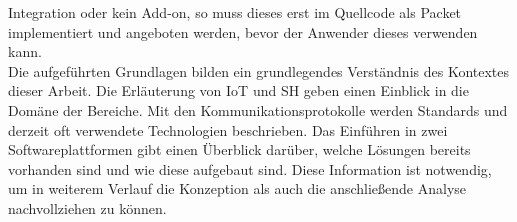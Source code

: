     Integration oder kein Add-on, so muss dieses erst im Quellcode als Packet implementiert und angeboten werden, bevor der 
    Anwender dieses verwenden kann. 
    \\
    \linebreak
    Die aufgeführten Grundlagen bilden ein grundlegendes Verständnis des Kontextes dieser Arbeit. Die Erläuterung von 
    \acs{IoT} und \acl{SH} geben einen Einblick in die Domäne der Bereiche. Mit den Kommunikationsprotokolle werden Standards 
    und derzeit oft verwendete Technologien beschrieben. Das Einführen in zwei Softwareplattformen gibt einen Überblick 
    darüber, welche Lösungen bereits vorhanden sind und wie diese aufgebaut sind. Diese Information ist notwendig, um in 
    weiterem Verlauf die Konzeption als auch die anschließende Analyse nachvollziehen zu können.

 